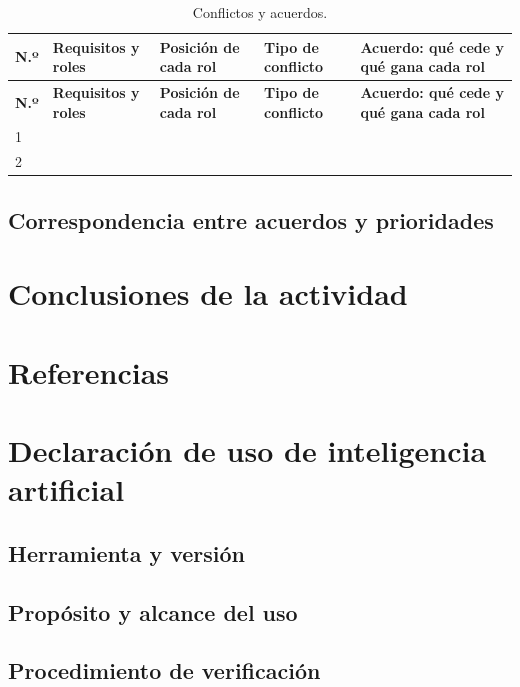 \documentclass[11pt,a4paper]{article}
\begin{document}
\begin{longtable}{
    |L{0.6cm}
    |L{2.2cm}
    |L{3.2cm}
    |L{2cm}
    |L{5cm}|
}
\caption{Conflictos y acuerdos.}
\label{tab:conflictos}\\
\hline
{}
\textbf{N.º} &
\textbf{Requisitos y roles} &
\textbf{Posición de cada rol} &
\textbf{Tipo de conflicto} &
\textbf{Acuerdo: qué cede y qué gana cada rol} \\
\hline
\endfirsthead

\hline
{}
\textbf{N.º} &
\textbf{Requisitos y roles} &
\textbf{Posición de cada rol} &
\textbf{Tipo de conflicto} &
\textbf{Acuerdo: qué cede y qué gana cada rol} \\
\hline
\endhead

1 & & & & \\  & & & & \\ \hline

\end{longtable}

\subsection{Correspondencia entre acuerdos y prioridades}

\section{Conclusiones de la actividad}

\section{Referencias}

\section{Declaración de uso de inteligencia artificial}

\subsection*{Herramienta y versión}

\subsection*{Propósito y alcance del uso}

\subsection*{Procedimiento de verificación}
\end{document}

